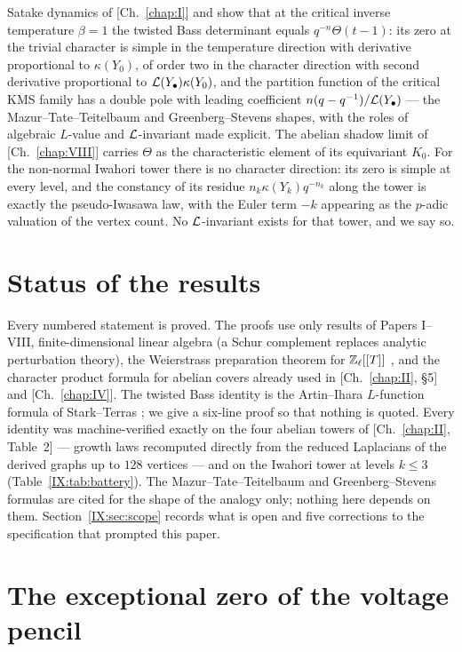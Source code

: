\begin{chapterabstract}
Satake dynamics of [Ch.~\ref{chap:I}] and show that at the critical inverse temperature $\beta=1$ the
twisted Bass determinant equals $q^{-n}\Theta(t-1)$: its zero at the trivial character
is simple in the temperature direction with derivative proportional to $\kappa(Y_0)$,
of order two in the character direction with second derivative proportional to
$\mathcal{L}(Y_\bullet)\kappa(Y_0)$, and the partition function of the critical KMS family has a
double pole with leading coefficient $n(q-q^{-1})/\mathcal{L}(Y_\bullet)$ --- the
Mazur--Tate--Teitelbaum and Greenberg--Stevens shapes, with the roles of algebraic
$L$-value and $\mathcal{L}$-invariant made explicit. The abelian shadow limit of [Ch.~\ref{chap:VIII}] carries
$\Theta$ as the characteristic element of its equivariant $K_0$. For the non-normal
Iwahori tower there is no character direction: its zero is simple at every level, and
the constancy of its residue $n_k\kappa(Y_k)q^{-n_k}$ along the tower is exactly the
pseudo-Iwasawa law, with the Euler term $-k$ appearing as the $p$-adic valuation of the
vertex count. No $\mathcal{L}$-invariant exists for that tower, and we say so.
\end{chapterabstract}

\section*{Status of the results}

Every numbered statement is proved. The proofs use only results of Papers I--VIII,
finite-dimensional linear algebra (a Schur complement replaces analytic perturbation
theory), the Weierstrass preparation theorem for $\mathbb{Z}_\ell[[T]]$ \cite{Wa}, and the character
product formula for abelian covers already used in [Ch.~\ref{chap:II}, \S5] and [Ch.~\ref{chap:IV}]. The twisted Bass
identity is the Artin--Ihara $L$-function formula of Stark--Terras \cite{ST}; we give a
six-line proof so that nothing is quoted. Every identity was machine-verified exactly
on the four abelian towers of [Ch.~\ref{chap:II}, Table~2] --- growth laws recomputed directly from the
reduced Laplacians of the derived graphs up to $128$ vertices --- and on the Iwahori tower
at levels $k\le3$ (Table~\ref{IX:tab:battery}). The Mazur--Tate--Teitelbaum \cite{MTT} and
Greenberg--Stevens \cite{GS} formulas are cited for the shape of the analogy only;
nothing here depends on them. Section~\ref{IX:sec:scope} records what is open and five
corrections to the specification that prompted this paper.

\section{The exceptional zero of the voltage pencil}\label{IX:sec:zero}


